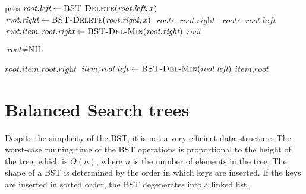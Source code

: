 \begin{algorithm}[H] \begin{algorithmic}[1]
        \State {}
            pass 
            \State $\textit{root.left} \gets \textsc{BST-Delete}(\textit{root.left}, x)$
            \State $\textit{root.right} \gets \textsc{BST-Delete}(\textit{root.right}, x)$
        \Else {~} 
                \State $\textit{root} \gets \textit{root.right}$ 
                \State $\textit{root} \gets \textit{root.left}$
            \Else {~} 
                \State $\textit{root.item}, \textit{root.right} \gets \textsc{BST-Del-Min}(\textit{root.right})$
            \EndIf
        \EndIf
        \State \Return $\textit{root}$
    \EndProcedure
\end{algorithmic} \end{algorithm}

\begin{algorithm}[H] \begin{algorithmic}[1]
        \State {}
        \Require $\textit{root} \neq \text{NIL}$

            \State \Return $\textit{root.item}, \textit{root.right}$
        \Else 
            \State $\textit{item}, \textit{root.left} \gets \textsc{BST-Del-Min}(\textit{root.left})$
            \State \Return $\textit{item}, \textit{root}$
        \EndIf
    \EndProcedure
\end{algorithmic} \end{algorithm}

\section{Balanced Search trees}

Despite the simplicity of the BST, it is not a very efficient data structure. The worst-case running time of the BST operations is proportional to the height of the tree, which is $\Theta(n)$, where $n$ is the number of elements in the tree. The shape of a BST is determined by the order in which keys are inserted. If the keys are inserted in sorted order, the BST degenerates into a linked list. 

